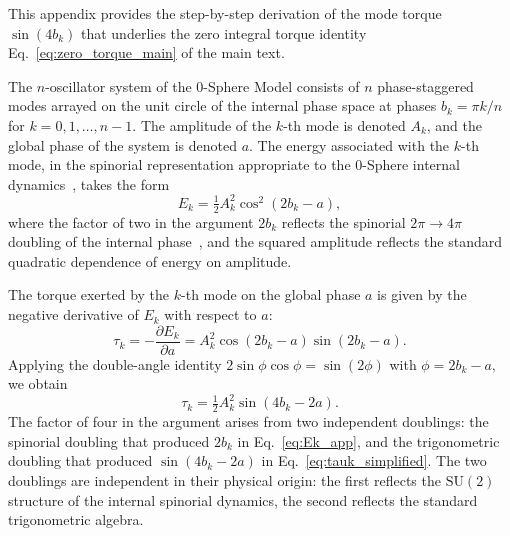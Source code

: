 \documentclass[%
 reprint, amsmath,amssymb, aps, prb, ]{revtex4-2}
\numberwithin{equation}{section}
\begin{document}
This appendix provides the step-by-step derivation of the mode torque $\sin(4 b_k)$ that underlies the zero integral torque identity Eq.~\eqref{eq:zero_torque_main} of the main text.

The $n$-oscillator system of the 0-Sphere Model consists of $n$ phase-staggered modes arrayed on the unit circle of the internal phase space at phases $b_k = \pi k/n$ for $k = 0, 1, \ldots, n-1$. The amplitude of the $k$-th mode is denoted $A_k$, and the global phase of the system is denoted $a$. The energy associated with the $k$-th mode, in the spinorial representation appropriate to the 0-Sphere internal dynamics~\cite{hanamura26, hanamura48}, takes the form
\begin{equation}
E_k = \tfrac{1}{2} A_k^2 \cos^2(2 b_k - a),
\label{eq:Ek_app}
\end{equation}
where the factor of two in the argument $2 b_k$ reflects the spinorial $2\pi \to 4\pi$ doubling of the internal phase~\cite{hanamura26, hanamura50}, and the squared amplitude reflects the standard quadratic dependence of energy on amplitude.

The torque exerted by the $k$-th mode on the global phase $a$ is given by the negative derivative of $E_k$ with respect to $a$:
\begin{equation}
\tau_k = -\frac{\partial E_k}{\partial a} = A_k^2 \cos(2 b_k - a) \sin(2 b_k - a).
\label{eq:tauk_app}
\end{equation}
Applying the double-angle identity $2 \sin\phi \cos\phi = \sin(2\phi)$ with $\phi = 2 b_k - a$, we obtain
\begin{equation}
\tau_k = \tfrac{1}{2} A_k^2 \sin(4 b_k - 2 a).
\label{eq:tauk_simplified}
\end{equation}
The factor of four in the argument arises from two independent doublings: the spinorial doubling that produced $2 b_k$ in Eq.~\eqref{eq:Ek_app}, and the trigonometric doubling that produced $\sin(4 b_k - 2 a)$ in Eq.~\eqref{eq:tauk_simplified}. The two doublings are independent in their physical origin: the first reflects the $\mathrm{SU}(2)$ structure of the internal spinorial dynamics, the second reflects the standard trigonometric algebra.
\end{document}
